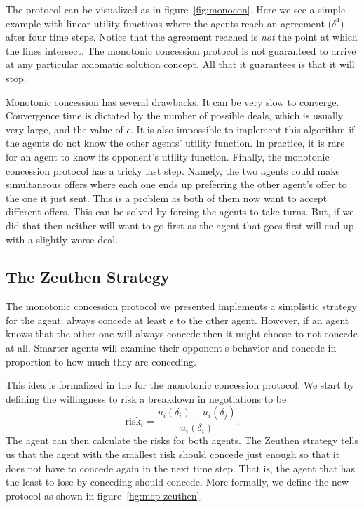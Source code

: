 The protocol can be visualized as in figure~\ref{fig:monocon}. Here we
see a simple example with linear utility functions where the agents
reach an agreement ($\delta^4$) after four time steps. Notice that the
agreement reached is \emph{not} the point at which the lines
intersect. The monotonic concession protocol is not guaranteed to
arrive at any particular axiomatic solution concept.  All that it
guarantees is that it will stop.

Monotonic concession has several drawbacks. It can be very slow to
converge. Convergence time is dictated by the number of possible
deals, which is usually very large, and the value of $\epsilon$. It is
also impossible to implement this algorithm if the agents do not know
the other agents' utility function.  In practice, it is rare for an agent to know its
opponent's utility function. Finally, the monotonic concession
protocol has a tricky last step. Namely, the two agents could make
simultaneous offers where each one ends up preferring the other
agent's offer to the one it just sent. This is a problem as both of
them now want to accept different offers. This can be solved by
forcing the agents to take turns. But, if we did that then neither
will want to go first as the agent that goes first will end up with a
slightly worse deal.

\subsection{The Zeuthen Strategy}

The monotonic concession protocol we presented implements a simplistic
strategy for the agent: always concede at least $\epsilon$ to the
other agent. However, if an agent knows that the other one will always
concede then it might choose to not concede at all. Smarter agents
will examine their opponent's behavior and concede in proportion to
how much they are conceding.

This idea is formalized in the  for the monotonic
concession protocol. We start by defining the willingness to risk
a breakdown in negotiations to be
\begin{equation}
  \label{eq:6}
  \text{risk}_i = \frac{u_i(\delta_i) - u_i(\delta_j)}{u_i(\delta_i)}.
\end{equation}
The agent can then calculate the risks for both agents. The Zeuthen
strategy tells us that the agent with the smallest risk should concede
just enough so that it does not have to concede again in the next time
step. That is, the agent that has the least to lose by conceding
should concede. More formally, we define the new protocol as shown in
figure~\ref{fig:mcp-zeuthen}.


